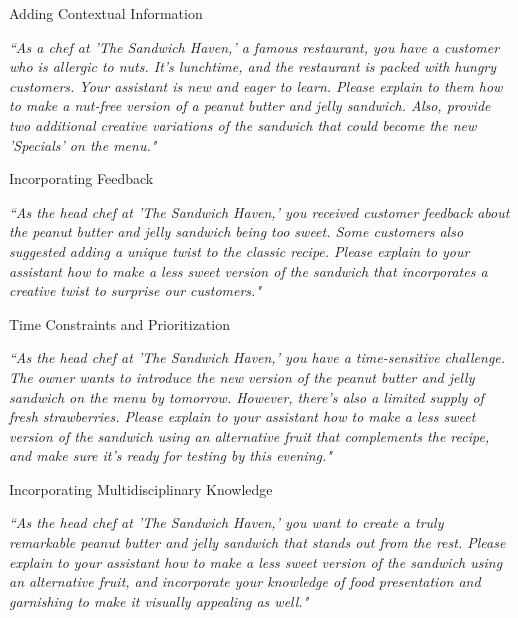 \begin{frame}[plain]
\centering
{\Huge Adding Contextual Information}

\vspace{2em}
{\Large \em ``As a chef at 'The Sandwich Haven,' a famous restaurant, you have a customer who is allergic to nuts. It's lunchtime, and the restaurant is packed with hungry customers. Your assistant is new and eager to learn. Please explain to them how to make a nut-free version of a peanut butter and jelly sandwich. Also, provide two additional creative variations of the sandwich that could become the new 'Specials' on the menu."}

\end{frame}


\begin{frame}[plain]
\centering
{\Huge Incorporating Feedback}

\vspace{2em}
{\Large \em ``As the head chef at 'The Sandwich Haven,' you received customer feedback about the peanut butter and jelly sandwich being too sweet. Some customers also suggested adding a unique twist to the classic recipe. Please explain to your assistant how to make a less sweet version of the sandwich that incorporates a creative twist to surprise our customers."}

\end{frame}

\begin{frame}[plain]
\centering
{\Huge  Time Constraints and Prioritization}

\vspace{2em}
{\Large \em ``As the head chef at 'The Sandwich Haven,' you have a time-sensitive challenge. The owner wants to introduce the new version of the peanut butter and jelly sandwich on the menu by tomorrow. However, there's also a limited supply of fresh strawberries. Please explain to your assistant how to make a less sweet version of the sandwich using an alternative fruit that complements the recipe, and make sure it's ready for testing by this evening."}

\end{frame}

\begin{frame}[plain]
\centering
{\Huge  Incorporating Multidisciplinary Knowledge}

\vspace{2em}
{\Large \em ``As the head chef at 'The Sandwich Haven,' you want to create a truly remarkable peanut butter and jelly sandwich that stands out from the rest. Please explain to your assistant how to make a less sweet version of the sandwich using an alternative fruit, and incorporate your knowledge of food presentation and garnishing to make it visually appealing as well."}

\end{frame}


